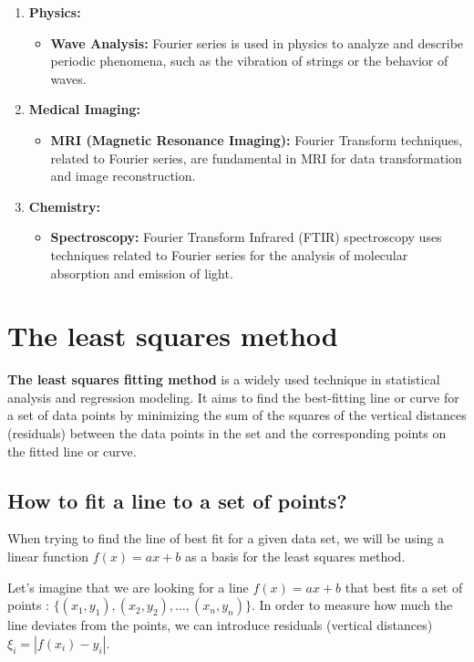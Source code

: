 \documentclass{MathematicaReport}
\begin{document}
\begin{enumerate}[label=\arabic*.]
    \item \textbf{Physics:}
    \begin{itemize}
        \item \textbf{Wave Analysis:} Fourier series is used in physics to analyze and describe periodic phenomena, such as the vibration of strings or the behavior of waves.
    \end{itemize}
    
    \item \textbf{Medical Imaging:}
    \begin{itemize}
        \item \textbf{MRI (Magnetic Resonance Imaging):} Fourier Transform techniques, related to Fourier series, are fundamental in MRI for data transformation and image reconstruction.
    \end{itemize}
    
    \item \textbf{Chemistry:}
    \begin{itemize}
        \item \textbf{Spectroscopy:} Fourier Transform Infrared (FTIR) spectroscopy uses techniques related to Fourier series for the analysis of molecular absorption and emission of light.
    \end{itemize}
\end{enumerate}


\section{The least squares method}
\textbf{The least squares fitting method} is a widely used technique in statistical
analysis and regression modeling. It aims to find the best-fitting line or curve
for a set of data points by minimizing the sum of the squares of the
vertical distances (residuals) between the data points in the set and the
corresponding points on the fitted line or curve. 

\subsection{How to fit a line to a set of points?}
When trying to find the line of best fit for a given data set, we will be using
a linear function \( f(x) = ax + b \)  as a basis for the least squares method.

Let's imagine that we are looking for a line \( f(x) = ax + b \) that best fits 
a set of points : \( \{(x_1,y_1), (x_2,y_2),\ldots,(x_n,y_n)\} \). 
In order to measure how much the line deviates from the points, we can introduce
residuals (vertical distances) \( \xi_i = | f(x_i) - y_i |  \). 
\end{document}
